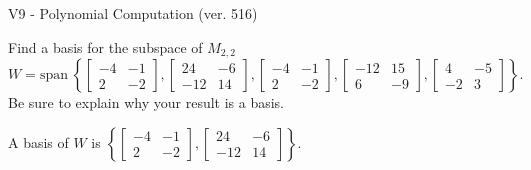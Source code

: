 \begin{exercise}
  \begin{exerciseTitle}V9 - Polynomial Computation (ver. 516)\end{exerciseTitle}
  \begin{exerciseStatement}
    Find a basis for the subspace of \(M_{2,2}\) 
\[W=\mathrm{span}\ \left\{\left[\begin{array}{cc}
-4 & -1 \\
2 & -2
\end{array}\right] , \left[\begin{array}{cc}
24 & -6 \\
-12 & 14
\end{array}\right] , \left[\begin{array}{cc}
-4 & -1 \\
2 & -2
\end{array}\right] , \left[\begin{array}{cc}
-12 & 15 \\
6 & -9
\end{array}\right] , \left[\begin{array}{cc}
4 & -5 \\
-2 & 3
\end{array}\right]\right\}.\]
 Be sure to explain why your result is a basis.


  \end{exerciseStatement}
  \begin{exerciseAnswer}
   A basis of \(W\) is  \(\left\{\left[\begin{array}{cc}
-4 & -1 \\
2 & -2
\end{array}\right] , \left[\begin{array}{cc}
24 & -6 \\
-12 & 14
\end{array}\right]\right\}\).
  


  \end{exerciseAnswer}
\end{exercise}